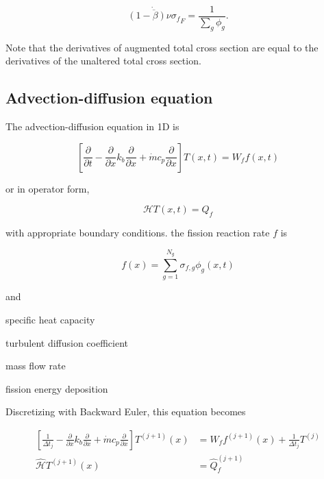 \documentclass{proposal}
\newcommand{\calH}{\ensuremath{\mathcal{H}}}
\newcommand{\ddx}{\ensuremath{\frac{\partial}{\partial x}}}
\newcommand{\ddt}{\ensuremath{\frac{\partial}{\partial t}}}
\begin{document}
\begin{equation}
    \dot{\overline{(1-\beta)\nu\sigma_f}}_{F} = \frac{1}{\sum_g \phi_g}.
\end{equation}

Note that the derivatives of augmented total cross section are equal to the derivatives of the unaltered total cross section.



\subsection{Advection-diffusion equation}

The advection-diffusion equation in 1D is


\begin{equation}\label{eq:timedep-adv-diffusion}
    \left[ \ddt - \ddx k_b \ddx + \dot{m}c_p \ddx \right]T(x, t) = W_f f(x, t)
\end{equation}

or in operator form,

\begin{equation}
    \calH T(x, t) = Q_f
\end{equation}

with appropriate boundary conditions. the fission reaction rate $f$ is 

\begin{equation}
    f(x) = \sum_{g=1}^{N_g} \sigma_{f, g}\phi_g(x, t)
\end{equation}

and

\begin{description}[labelindent=1cm, labelwidth=1.2cm, before={\renewcommand\makelabel[1]{##1 $=$}}]
    \item[$c_p$] specific heat capacity
    \item[$k_b$] turbulent diffusion coefficient
    \item[$\dot{m}$] mass flow rate
    \item[$W_f$] fission energy deposition
\end{description}

Discretizing with Backward Euler, this equation becomes

\begin{align}
    \left[ \frac{1}{\Delta t_j} - \ddx k_b \ddx + \dot{m}c_p \ddx \right]T^{(j+1)}(x) &= W_f f^{(j+1)}(x) + \frac{1}{\Delta t_j}T^{(j)}\\
    \hat{\calH}T^{(j+1)}(x) &= \hat{Q}_f^{(j+1)}
\end{align}
\end{document}
